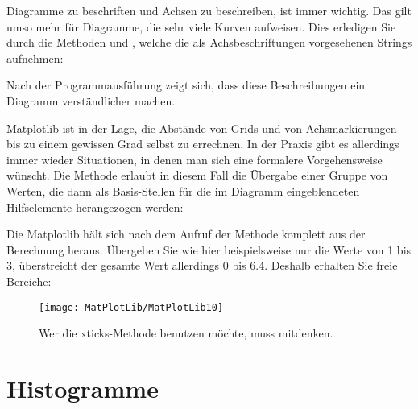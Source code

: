 Diagramme zu beschriften und Achsen zu beschreiben, ist immer wichtig. Das gilt umso mehr für Diagramme, die sehr viele Kurven aufweisen. Dies erledigen Sie durch die Methoden  und , welche die als Achsbeschriftungen vorgesehenen Strings aufnehmen:

\medskip







\medskip

Nach der Programmausführung zeigt sich, dass diese Beschreibungen ein Diagramm verständlicher machen.

Matplotlib ist in der Lage, die Abstände von Grids und von Achsmarkierungen bis zu einem gewissen Grad selbst zu errechnen. In der Praxis gibt es allerdings immer wieder Situationen, in denen man sich eine formalere Vorgehensweise wünscht. Die Methode  erlaubt in diesem Fall die Übergabe einer Gruppe von Werten, die dann als Basis-Stellen für die im Diagramm eingeblendeten Hilfselemente herangezogen werden:

\medskip





\medskip

Die Matplotlib hält sich nach dem Aufruf der Methode komplett aus der Berechnung heraus. Übergeben Sie wie hier beispielsweise nur die Werte von 1 bis 3, überstreicht der gesamte Wert allerdings 0 bis 6.4. Deshalb erhalten Sie freie Bereiche:

\begin{figure}
  \begin{center}  
    \texttt{[image: MatPlotLib/MatPlotLib10]}      
        
    \caption{Wer die xticks-Methode benutzen möchte, muss mitdenken.}\label{Matplotlib10}
  \end{center}    
\end{figure}


\section{Histogramme}

